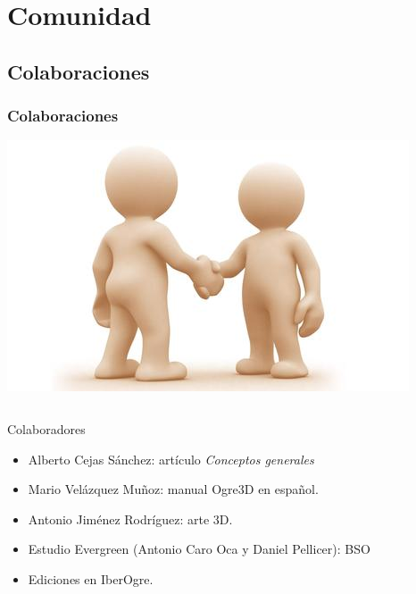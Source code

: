 \documentclass[green]{beamer}
\begin{document}
\section{Comunidad}

\subsection{Colaboraciones}


\begin{frame}
\transdissolve
    \frametitle{Colaboraciones}
    
    \begin{center}
	\includegraphics[scale=0.10]{img/colaboradores.jpg}
    \end{center}
    
    \begin{columns}[t]
    \column{150pt}
        
	\scriptsize{
	\begin{block}{Colaboradores}
            \begin{itemize}
                \item Alberto Cejas Sánchez: artículo \emph{Conceptos generales}
		\item Mario Velázquez Muñoz: manual Ogre3D en español.
		\item Antonio Jiménez Rodríguez: arte 3D.
		\item Estudio Evergreen (Antonio Caro Oca y Daniel Pellicer): BSO
		\item Ediciones en IberOgre.
            \end{itemize}            
        \end{block}
	}


\end{columns}
\end{frame}
\end{document}
